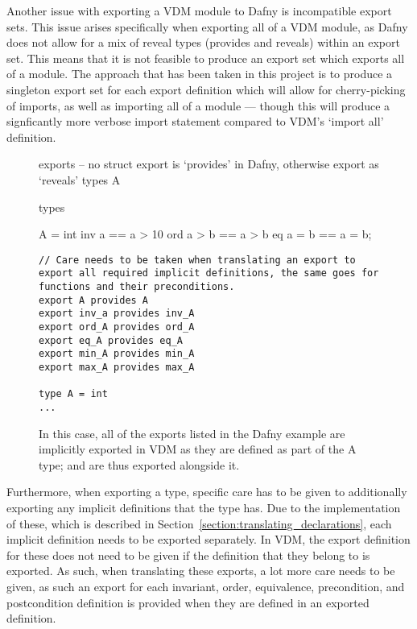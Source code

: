 \documentclass{entcs}
\begin{document}
Another issue with exporting a VDM module to Dafny is incompatible export sets. This issue arises specifically when exporting all of a VDM module, as Dafny does not allow for a mix of reveal types (provides and reveals) within an export set. This means that it is not feasible to produce an export set which exports all of a module. The approach that has been taken in this project is to produce a singleton export set for each export definition which will allow for cherry-picking of imports, as well as importing all of a module --- though this will produce a signficantly more verbose import statement compared to VDM's `import all' definition.

\begin{figure}[h]
	\begin{center}
        \begin{vdmsl}
exports 
    -- no struct export is `provides' in Dafny, otherwise export as `reveals'
    types A

types 

A = int 
inv a == a > 10
ord a > b == a > b
eq a = b == a = b;
        
        \end{vdmsl}
        \begin{lstlisting}[language=Dafny]
// Care needs to be taken when translating an export to export all required implicit definitions, the same goes for functions and their preconditions.
export A provides A
export inv_a provides inv_A
export ord_A provides ord_A
export eq_A provides eq_A
export min_A provides min_A
export max_A provides max_A

type A = int 
...
        \end{lstlisting}
		\caption{In this case, all of the exports listed in the Dafny example are implicitly exported in VDM as they are defined as part of the A type; and are thus exported alongside it.}\label{fig:dafny_exports}
	\end{center}
\end{figure}

Furthermore, when exporting a type, specific care has to be given to additionally exporting any implicit definitions that the type has. Due to the implementation of these, which is described in Section~\ref{section:translating_declarations}, each implicit definition needs to be exported separately. In VDM, the export definition for these does not need to be given if the definition that they belong to is exported. As such, when translating these exports, a lot more care needs to be given, as such an export for each invariant, order, equivalence, precondition, and postcondition definition is provided when they are defined in an exported definition.
\end{document}
